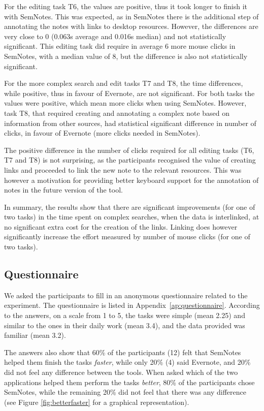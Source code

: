 For the editing task T6, the values are positive, thus it took longer to finish it with SemNotes. This was expected, as in SemNotes there is the additional step of annotating the notes with links to desktop resources. However, the differences are very close to 0 (0.063s average and 0.016s median) and not statistically significant. This editing task did require in average 6 more mouse clicks in SemNotes, with a median value of 8, but the difference is also not statistically significant.

For the more complex search and edit tasks T7 and T8, the time differences, while positive, thus in favour of Evernote, are not significant. For both tasks the values were positive, which mean more clicks when using SemNotes. However, task T8, that required creating and annotating a complex note based on information from other sources, had statistical significant difference in number of clicks, in favour of Evernote (more clicks needed in SemNotes). 

The positive difference in the number of clicks required for all editing tasks (T6, T7 and T8) is not surprising, as the participants recognised the value of creating links and proceeded to link the new note to the relevant resources. This was however a motivation for providing better keyboard support for the annotation of notes in the future version of the tool.

In summary, the results show that there are significant improvements (for one of two tasks) in the time spent on complex searches, when the data is interlinked, at no significant extra cost for the creation of the links. Linking does however significantly increase the effort measured by number of mouse clicks (for one of two tasks).

\subsection{Questionnaire}

We asked the participants to fill in an anonymous questionnaire related to the experiment. The questionnaire is listed in Appendix~\ref{ap:questionnaire}. According to the answers, on a scale from 1 to 5, the tasks were simple (mean 2.25) and similar to the ones in their daily work (mean 3.4), and the data provided was familiar (mean 3.2). 

The answers also show that 60\% of the participants (12) felt that SemNotes helped them finish the tasks \emph{faster}, while only 20\% (4) said Evernote, and 20\% did not feel any difference between the tools. When asked which of the two applications helped them perform the tasks \emph{better}, 80\% of the participants chose SemNotes, while the remaining 20\% did not feel that there was any difference (see Figure \ref{fig:betterfaster} for a graphical representation).

